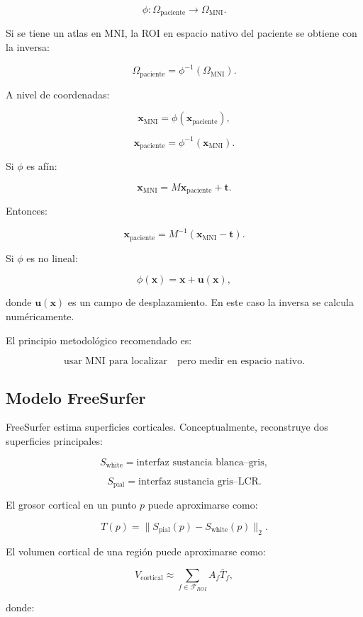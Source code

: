 \documentclass[12pt,a4paper]{article}
\begin{document}
\[
\phi:
\Omega_{\text{paciente}}
\rightarrow
\Omega_{\text{MNI}}.
\]

Si se tiene un atlas en MNI, la ROI en espacio nativo del paciente se obtiene con la inversa:

\[
\Omega_{\text{paciente}}
=
\phi^{-1}
(
\Omega_{\text{MNI}}
).
\]

A nivel de coordenadas:

\[
\mathbf{x}_{\text{MNI}}
=
\phi(\mathbf{x}_{\text{paciente}}),
\]

\[
\mathbf{x}_{\text{paciente}}
=
\phi^{-1}(\mathbf{x}_{\text{MNI}}).
\]

Si \(\phi\) es afín:

\[
\mathbf{x}_{\text{MNI}}
=
M\mathbf{x}_{\text{paciente}}
+
\mathbf{t}.
\]

Entonces:

\[
\mathbf{x}_{\text{paciente}}
=
M^{-1}
(
\mathbf{x}_{\text{MNI}}-\mathbf{t}
).
\]

Si \(\phi\) es no lineal:

\[
\phi(\mathbf{x})
=
\mathbf{x}
+
\mathbf{u}(\mathbf{x}),
\]

donde \(\mathbf{u}(\mathbf{x})\) es un campo de desplazamiento. En este caso la inversa se calcula numéricamente.

El principio metodológico recomendado es:

\[
\text{usar MNI para localizar}
\quad
\text{pero medir en espacio nativo}.
\]

\subsection{Modelo FreeSurfer}

FreeSurfer estima superficies corticales. Conceptualmente, reconstruye dos superficies principales:

\[
S_{\text{white}}
=
\text{interfaz sustancia blanca--gris},
\]

\[
S_{\text{pial}}
=
\text{interfaz sustancia gris--LCR}.
\]

El grosor cortical en un punto \(p\) puede aproximarse como:

\[
T(p)
=
\|S_{\text{pial}}(p)-S_{\text{white}}(p)\|_2.
\]

El volumen cortical de una región puede aproximarse como:

\[
V_{\text{cortical}}
\approx
\sum_{f\in\mathcal{F}_{ROI}}
A_f \bar{T}_f,
\]

donde:
\end{document}
